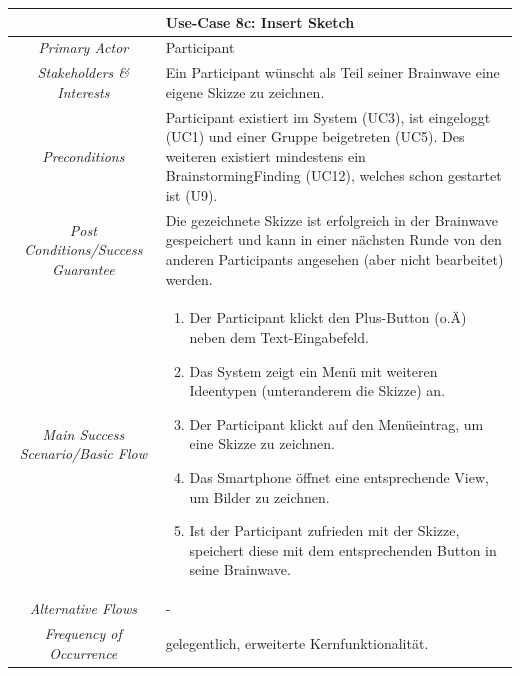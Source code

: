 \renewcommand{\arraystretch}{1.35}
\begin{center}
	\begin{longtable}{| c | p{7cm} |}
		\hline
		\multicolumn{2}{|c|}{\textbf{Use-Case 8c: Insert Sketch}}\\
		\hline\hline
		\textit{Primary Actor} & Participant\\
		\hline
		\textit{Stakeholders \& Interests} & Ein Participant wünscht als Teil seiner Brainwave eine eigene Skizze zu zeichnen. \\
		\hline
		\textit{Preconditions} & Participant existiert im System (UC3), ist eingeloggt (UC1) und einer Gruppe beigetreten (UC5). Des weiteren existiert mindestens ein BrainstormingFinding (UC12), welches schon gestartet ist (U9).\\
		\hline
		\textit{Post Conditions/Success Guarantee} & Die gezeichnete Skizze ist erfolgreich in der Brainwave gespeichert und kann in einer nächsten Runde von den anderen Participants angesehen (aber nicht bearbeitet) werden.\\
		\hline
		\textit{Main Success Scenario/Basic Flow} & 
		\begin{enumerate}[noitemsep]
			\item Der Participant klickt den Plus-Button (o.Ä) neben dem Text-Eingabefeld.
			\item Das System zeigt ein Menü mit weiteren Ideentypen (unteranderem die Skizze) an.
			\item Der Participant klickt auf den Menüeintrag, um eine Skizze zu zeichnen.
			\item Das Smartphone öffnet eine entsprechende View, um Bilder zu zeichnen.
			\item Ist der Participant zufrieden mit der Skizze, speichert diese mit dem entsprechenden Button in seine Brainwave.
		\end{enumerate}\\
		\hline
		\textit{Alternative Flows} &
		-\\
		\hline
		\textit{Frequency of Occurrence} & gelegentlich, erweiterte Kernfunktionalität.\\
		\hline
	\end{longtable}
\end{center}

